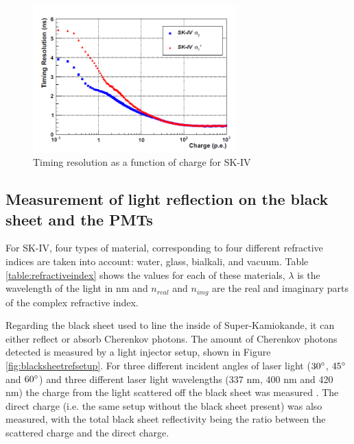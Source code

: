 \begin{figure}
    \centering
    \includegraphics[width=0.7\textwidth]{Figures/resolutiont.png}
\caption{Timing resolution as a function of charge for SK-IV}
    \label{fig:resolutiont}
\end{figure}

\subsection{Measurement of light reflection on the black sheet and the PMTs} 

 For SK-IV, four types of material, corresponding to four different refractive indices are taken into account: water, glass, bialkali, and vacuum. Table \ref{table:refractiveindex} shows the values for each of these materials, $\lambda$ is the wavelength of the light in nm and $n_{real}$ and $n_{img}$ are the real and imaginary parts of the complex refractive index.

Regarding the black sheet used to line the inside of Super-Kamiokande, it can either reflect or absorb Cherenkov photons. The amount of Cherenkov photons detected is measured by a light injector setup, shown in Figure \ref{fig:blacksheetrefsetup}. For three different incident angles of laser light ($30 \degree$, $45 \degree$ and $60 \degree$) and three different laser light wavelengths (337 nm, 400 nm and 420 nm) the charge from the light scattered off the black sheet was measured \cite{hosaka2006solar}. The direct charge (i.e. the same setup without the black sheet present) was also measured, with the total black sheet reflectivity being the ratio between the scattered charge and the direct charge.


